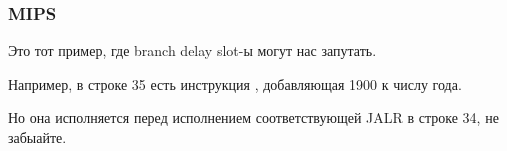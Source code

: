 \subsubsection{MIPS}



Это тот пример, где branch delay slot-ы могут нас запутать.

Например, в строке 35 есть инструкция , добавляющая 1900 к числу года.

Но она исполняется перед исполнением соответствующей JALR в строке 34, не забыайте.

